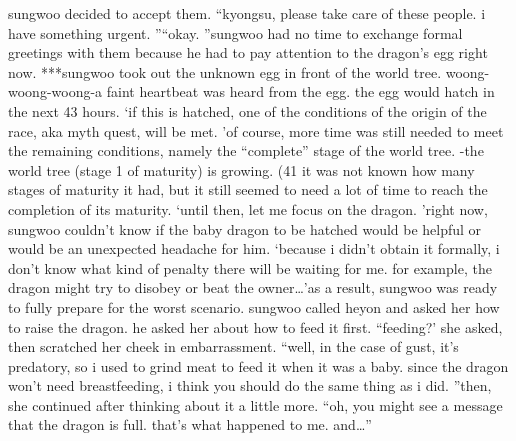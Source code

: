  sungwoo decided to accept them.
“kyongsu, please take care of these people.
 i have something urgent.
”“okay.
”sungwoo had no time to exchange formal greetings with them because he had to pay attention to the dragon’s egg right now.
***sungwoo took out the unknown egg in front of the world tree.
woong-woong-woong-a faint heartbeat was heard from the egg.
 the egg would hatch in the next 43 hours.
‘if this is hatched, one of the conditions of the origin of the race, aka myth quest, will be met.
’of course, more time was still needed to meet the remaining conditions, namely the “complete” stage of the world tree.
-the world tree (stage 1 of maturity) is growing.
 (41%
 it was not known how many stages of maturity it had, but it still seemed to need a lot of time to reach the completion of its maturity.
‘until then, let me focus on the dragon.
’right now, sungwoo couldn’t know if the baby dragon to be hatched would be helpful or would be an unexpected headache for him.
‘because i didn’t obtain it formally, i don’t know what kind of penalty there will be waiting for me.
 for example, the dragon might try to disobey or beat the owner…’as a result, sungwoo was ready to fully prepare for the worst scenario.
sungwoo called heyon and asked her how to raise the dragon.
he asked her about how to feed it first.
“feeding?’ she asked, then scratched her cheek in embarrassment.
“well, in the case of gust, it’s predatory, so i used to grind meat to feed it when it was a baby.
 since the dragon won’t need breastfeeding, i think you should do the same thing as i did.
”then, she continued after thinking about it a little more.
“oh, you might see a message that the dragon is full.
 that’s what happened to me.
 and…”

